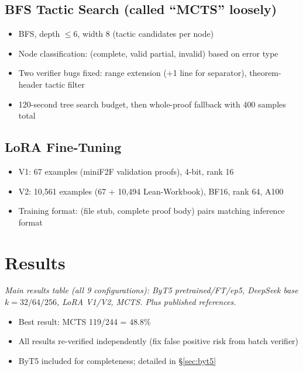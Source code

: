 \documentclass[openany, amssymb, psamsfonts]{amsart}
\begin{document}
\subsection{BFS Tactic Search (called ``MCTS'' loosely)}
\begin{itemize}
  \item BFS, depth $\leq 6$, width 8 (tactic candidates per node)
  \item Node classification: (complete, valid partial, invalid) based on error type
  \item Two verifier bugs fixed: range extension (+1 line for separator), theorem-header tactic filter
  \item 120-second tree search budget, then whole-proof fallback with 400 samples total
\end{itemize}

\subsection{LoRA Fine-Tuning}
\begin{itemize}
  \item V1: 67 examples (miniF2F validation proofs), 4-bit, rank 16
  \item V2: 10,561 examples (67 + 10,494 Lean-Workbook), BF16, rank 64, A100
  \item Training format: (file stub, complete proof body) pairs matching inference format
\end{itemize}

\section{Results}

\textit{Main results table (all 9 configurations): ByT5 pretrained/FT/ep5, DeepSeek base $k=32/64/256$, LoRA V1/V2, MCTS. Plus published references.}

\begin{itemize}
  \item Best result: MCTS 119/244 = 48.8\%
  \item All results re-verified independently (fix false positive risk from batch verifier)
  \item ByT5 included for completeness; detailed in \S\ref{sec:byt5}
\end{itemize}

\end{document}

